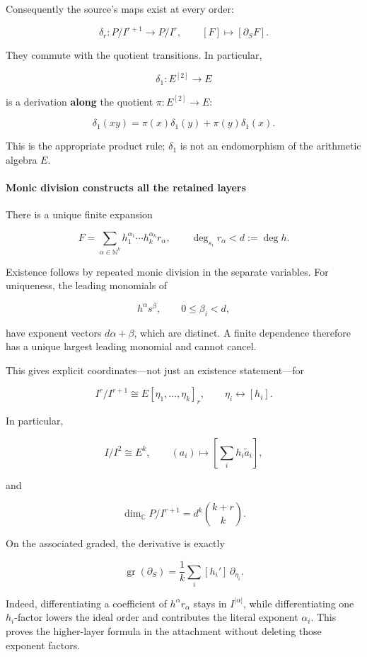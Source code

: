 Consequently the source's maps exist at every order:

\[
\delta_r:P/I^{r+1}\longrightarrow P/I^r,
\qquad
[F]\longmapsto[\partial_SF].
\]

They commute with the quotient transitions. In particular,

\[
\delta_1:E^{[2]}\longrightarrow E
\]

is a derivation \textbf{along} the quotient \(\pi:E^{[2]}\to E\):

\[
\boxed{
\delta_1(xy)=\pi(x)\delta_1(y)+\pi(y)\delta_1(x).
}
\]

This is the appropriate product rule; \(\delta_1\) is not an endomorphism of the arithmetic algebra
\(E\).

\paragraph{Monic division constructs all the retained
layers}\label{conormal_tower_pasted:monic-division-constructs-all-the-retained-layers}

There is a unique finite expansion

\[
F=\sum_{\alpha\in\mathbb N^k}
h_1^{\alpha_1}\cdots h_k^{\alpha_k}r_\alpha,
\qquad
\deg_{s_i}r_\alpha<d:=\deg h.
\]

Existence follows by repeated monic division in the separate variables. For uniqueness, the leading
monomials of

\[
h^\alpha s^\beta,\qquad 0\le\beta_i<d,
\]

have exponent vectors \(d\alpha+\beta\), which are distinct. A finite dependence therefore has a
unique largest leading monomial and cannot cancel.

This gives explicit coordinates---not just an existence statement---for

\[
I^r/I^{r+1}\cong E[\eta_1,\ldots,\eta_k]_r,
\qquad
\eta_i\longleftrightarrow[h_i].
\]

In particular,

\[
I/I^2\cong E^k,
\qquad
(a_i)\longmapsto\left[\sum_i h_i\widetilde a_i\right],
\]

and

\[
\dim_{\mathbb C}P/I^{r+1}
=d^k\binom{k+r}{k}.
\]

On the associated graded, the derivative is exactly

\[
\boxed{
\operatorname{gr}(\partial_S)
=
\frac1k\sum_i[h_i']\,\partial_{\eta_i}.
}
\]

Indeed, differentiating a coefficient of \(h^\alpha r_\alpha\) stays in \(I^{|\alpha|}\), while
differentiating one \(h_i\)-factor lowers the ideal order and contributes the literal exponent
\(\alpha_i\). This proves the higher-layer formula in the attachment without deleting those exponent
factors.

